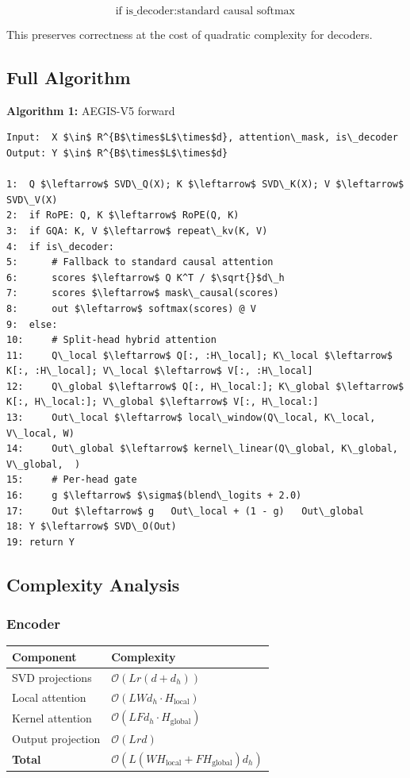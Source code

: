 \[
\text{if } \text{is\_decoder} : \text{standard causal softmax}
\]

This preserves correctness at the cost of quadratic complexity for decoders.

\subsection{Full Algorithm}

\textbf{Algorithm 1:} AEGIS-V5 forward
\begin{lstlisting}
Input:  X $\in$ R^{B$\times$L$\times$d}, attention\_mask, is\_decoder
Output: Y $\in$ R^{B$\times$L$\times$d}

1:  Q $\leftarrow$ SVD\_Q(X); K $\leftarrow$ SVD\_K(X); V $\leftarrow$ SVD\_V(X)
2:  if RoPE: Q, K $\leftarrow$ RoPE(Q, K)
3:  if GQA: K, V $\leftarrow$ repeat\_kv(K, V)
4:  if is\_decoder:
5:      # Fallback to standard causal attention
6:      scores $\leftarrow$ Q K^T / $\sqrt{}$d\_h
7:      scores $\leftarrow$ mask\_causal(scores)
8:      out $\leftarrow$ softmax(scores) @ V
9:  else:
10:     # Split-head hybrid attention
11:     Q\_local $\leftarrow$ Q[:, :H\_local]; K\_local $\leftarrow$ K[:, :H\_local]; V\_local $\leftarrow$ V[:, :H\_local]
12:     Q\_global $\leftarrow$ Q[:, H\_local:]; K\_global $\leftarrow$ K[:, H\_local:]; V\_global $\leftarrow$ V[:, H\_local:]
13:     Out\_local $\leftarrow$ local\_window(Q\_local, K\_local, V\_local, W)
14:     Out\_global $\leftarrow$ kernel\_linear(Q\_global, K\_global, V\_global,  )
15:     # Per-head gate
16:     g $\leftarrow$ $\sigma$(blend\_logits + 2.0)
17:     Out $\leftarrow$ g   Out\_local + (1 - g)   Out\_global
18: Y $\leftarrow$ SVD\_O(Out)
19: return Y
\end{lstlisting}

\subsection{Complexity Analysis}

\subsubsection{Encoder}

\begin{table}[H]
\centering
\small
\begin{tabular}{ll}
\toprule
\textbf{Component} & \textbf{Complexity} \\
\midrule
SVD projections & $\mathcal{O}(L r (d + d_h))$ \\
Local attention & $\mathcal{O}(L W d_h \cdot H_\text{local})$ \\
Kernel attention & $\mathcal{O}(L F d_h \cdot H_\text{global})$ \\
Output projection & $\mathcal{O}(L r d)$ \\
\textbf{Total} & $\mathcal{O}(L(W H_\text{local} + F H_\text{global}) d_h)$ \\
\bottomrule
\end{tabular}
\end{table}

